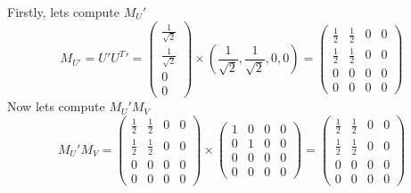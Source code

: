 \documentclass[12pt,twoside]{article}
\begin{document}
Firstly, lets compute $M_U'$
$$
    M_{U'} = U' U^T' = \begin{pmatrix}
    \frac{1}{\sqrt{2}}\\
        \frac{1}{\sqrt{2}}\\
        0\\
        0
    \end{pmatrix} \times (\frac{1}{\sqrt{2}},\frac{1}{\sqrt{2}},0,0) = 
    \begin{pmatrix}
    \frac{1}{2} &     \frac{1}{2} & 0 & 0 \\
        \frac{1}{2} &     \frac{1}{2} & 0 & 0 \\
        0 & 0 & 0 & 0 \\
        0 & 0 & 0 & 0
    \end{pmatrix}
$$
Now lets compute $M_U' M_V$
$$
    M_U' M_V =    \begin{pmatrix}
    \frac{1}{2} &     \frac{1}{2} & 0 & 0 \\
        \frac{1}{2} &     \frac{1}{2} & 0 & 0 \\
        0 & 0 & 0 & 0 \\
        0 & 0 & 0 & 0
    \end{pmatrix} \times \begin{pmatrix}
    1 & 0 & 0 & 0\\
    0 & 1 & 0 & 0\\
    0 & 0 & 0 & 0\\
    0 & 0 & 0 & 0 
    \end{pmatrix}
    = \begin{pmatrix}
    \frac{1}{2} &     \frac{1}{2} & 0 & 0 \\
        \frac{1}{2} &     \frac{1}{2} & 0 & 0 \\
        0 & 0 & 0 & 0 \\
        0 & 0 & 0 & 0 \end{pmatrix}
$$  
\end{document}
